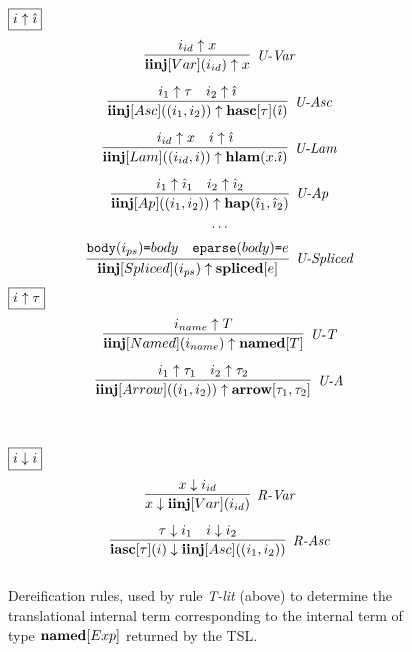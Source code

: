 \begin{figure}[t]
\centering
\begin{minipage}[t]{.51\textwidth}
$\fbox{$i \uparrow \hat{\imath}$}$
\vspace{-20px}
   \[
\begin{array}{c}
\infer[\textit{U-Var}]
	{ \keyw{iinj}[Var](i_{id}) \uparrow x}
	{ i_{id} \uparrow x} \\[2ex]

\infer[\textit{U-Asc}]
	{\keyw{iinj}[Asc]((i_1, i_2)) \uparrow \keyw{hasc}[\tau](\ih)}
	{i_1 \uparrow \tau & i_2 \uparrow \ih}\\[2ex]
	
\infer[\textit{U-Lam}]
	{ \keyw{iinj}[Lam]((i_{id}, i)) \uparrow \keyw{hlam}(x.\ih) }
	{ i_{id} \uparrow x & i \uparrow \ih } \\[2ex]

\infer[\textit{U-Ap}]
	{ \keyw{iinj}[Ap]((i_1, i_2)) \uparrow  \keyw{hap}(\ih_1, \ih_2)}
	{ i_1 \uparrow \ih_1 & i_2 \uparrow \ih_2  } \\[1ex]
\cdots\\[1ex]
\infer[\textit{U-Spliced}]
      {\keyw{iinj}[Spliced](i_{ps}) \uparrow \keyw{spliced}[e]}
	  {\texttt{body}(i_{ps})\texttt{=}body & \texttt{eparse}(body)\texttt{=}e}
\end{array}
\]
$\fbox{$i \uparrow \tau$}$
\vspace{-15px}
\[
\begin{array}{c}
\infer[\textit{U-T}]
	{ \keyw{iinj}[Named](i_{name}) \uparrow \keyw{named}[T]}
	{ i_{name} \uparrow T} \\[2ex]

\infer[\textit{U-A}]
	{ \keyw{iinj}[Arrow]((i_1, i_2)) \uparrow \keyw{arrow}[\tau_1, \tau_2]}
	{ i_1 \uparrow \tau_1 & i_2 \uparrow \tau_2}
\end{array}
\]
\label{fig:dereification}
\caption{Dereification rules, used by rule \textit{T-lit} (above) to determine the translational internal term corresponding to the internal term of type $\textbf{named}[Exp]$ returned by the TSL.}
\end{minipage}%
~\vline\,
\begin{minipage}[t]{.44\textwidth}
$\fbox{$i \downarrow i$}$
\vspace{-20px}
  \[
\begin{array}{c}
\infer[\textit{R-Var}]
	{x \downarrow \keyw{iinj}[Var](i_{id})}
	{x \downarrow i_{id}} \\[2ex]

\infer[\textit{R-Asc}]
	{\keyw{iasc}[\tau](i) \downarrow \keyw{iinj}[Asc]((i_1, i_2))}
	{\tau \downarrow i_1 & i \downarrow i_2}\\[2ex]
	

\end{array}\]
\end{minipage}
\end{figure}
